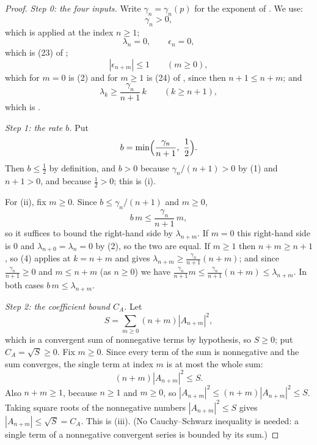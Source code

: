 \begin{proof}
\emph{Step 0: the four inputs.}  Write $\gamma_n=\gamma_n(p)$ for the exponent
of .  We use:
\begin{equation}\tag{1}
  \gamma_n>0 ,
\end{equation}
which is  applied at the index $n\ge1$;
\begin{equation}\tag{2}
  \lambda_n=0,\qquad \epsilon_n=0 ,
\end{equation}
which is (23) of ;
\begin{equation}\tag{3}
  |\epsilon_{n+m}|\le1\qquad(m\ge0),
\end{equation}
which for $m=0$ is (2) and for $m\ge1$ is (24) of
, since then $n+1\le n+m$; and
\begin{equation}\tag{4}
  \lambda_k\ge\frac{\gamma_n}{n+1}\,k\qquad(k\ge n+1),
\end{equation}
which is .

\emph{Step 1: the rate $b$.}  Put
\[
  b=\min\Bigl(\frac{\gamma_n}{n+1},\ \frac12\Bigr).
\]
Then $b\le\tfrac12$ by definition, and $b>0$ because $\gamma_n/(n+1)>0$ by (1)
and $n+1>0$, and because $\tfrac12>0$; this is (i).

For (ii), fix $m\ge0$.  Since $b\le\gamma_n/(n+1)$ and $m\ge0$,
\[
  b\,m\le\frac{\gamma_n}{n+1}\,m ,
\]
so it suffices to bound the right-hand side by $\lambda_{n+m}$.  If $m=0$ this
right-hand side is $0$ and $\lambda_{n+0}=\lambda_n=0$ by (2), so the two are
equal.  If $m\ge1$ then $n+m\ge n+1$, so (4) applies at $k=n+m$ and gives
$\lambda_{n+m}\ge\frac{\gamma_n}{n+1}(n+m)$; and since
$\frac{\gamma_n}{n+1}\ge0$ and $m\le n+m$ (as $n\ge0$) we have
$\frac{\gamma_n}{n+1}m\le\frac{\gamma_n}{n+1}(n+m)\le\lambda_{n+m}$.  In both
cases $b\,m\le\lambda_{n+m}$.

\emph{Step 2: the coefficient bound $C_A$.}  Let
\[
  S=\sum_{m\ge0}(n+m)|A_{n+m}|^{2},
\]
which is a convergent sum of nonnegative terms by hypothesis, so $S\ge0$; put
$C_A=\sqrt S\ge0$.  Fix $m\ge0$.  Since every term of the sum is nonnegative
and the sum converges, the single term at index $m$ is at most the whole sum:
\[
  (n+m)|A_{n+m}|^{2}\le S .
\]
Also $n+m\ge1$, because $n\ge1$ and $m\ge0$, so
$|A_{n+m}|^{2}\le(n+m)|A_{n+m}|^{2}\le S$.  Taking square roots of the
nonnegative numbers $|A_{n+m}|^{2}\le S$ gives $|A_{n+m}|\le\sqrt S=C_A$.
This is (iii).  (No Cauchy--Schwarz inequality is needed: a single term of a
nonnegative convergent series is bounded by its sum.)


\end{proof}
